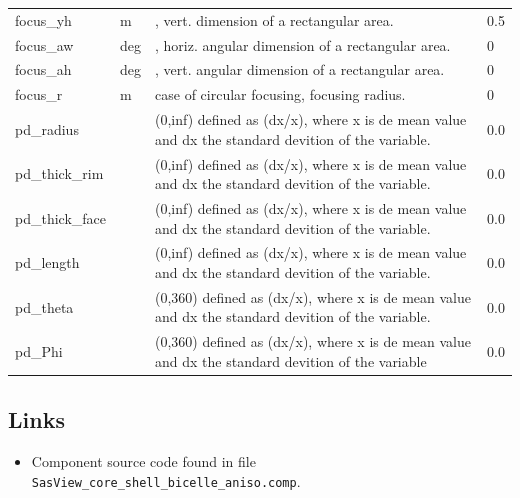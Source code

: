 \begin{longtable}{p{}p{}p{}p{}}
focus\_yh & m & , vert. dimension of a rectangular area. & 0.5 \\
focus\_aw & deg & , horiz. angular dimension of a rectangular area. & 0 \\
focus\_ah & deg & , vert. angular dimension of a rectangular area. & 0 \\
focus\_r & m & case of circular focusing, focusing radius. & 0 \\
pd\_radius &  & (0,inf) defined as (dx/x), where x is de mean value and dx the standard devition of the variable. & 0.0 \\
pd\_thick\_rim &  & (0,inf) defined as (dx/x), where x is de mean value and dx the standard devition of the variable. & 0.0 \\
pd\_thick\_face &  & (0,inf) defined as (dx/x), where x is de mean value and dx the standard devition of the variable. & 0.0 \\
pd\_length &  & (0,inf) defined as (dx/x), where x is de mean value and dx the standard devition of the variable. & 0.0 \\
pd\_theta &  & (0,360) defined as (dx/x), where x is de mean value and dx the standard devition of the variable. & 0.0 \\
pd\_Phi &  & (0,360) defined as (dx/x), where x is de mean value and dx the standard devition of the variable & 0.0 \\
\bottomrule
\end{longtable}

\subsection*{Links}
\begin{itemize}
  \item Component source code found in file \texttt{SasView\_core\_shell\_bicelle\_aniso.comp}.
\end{itemize}

